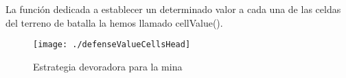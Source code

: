 La función dedicada a establecer un determinado valor a cada una de las celdas del terreno de batalla la hemos llamado cellValue().

\begin{figure}
\centering
\texttt{[image: ./defenseValueCellsHead]}
\caption{Estrategia devoradora para la mina}
\label{fig:defenseValueCellsHead}
\end{figure}
